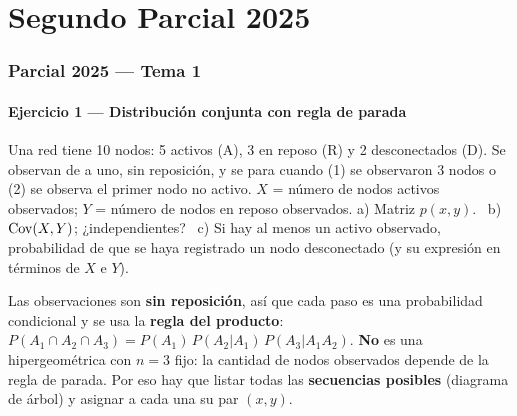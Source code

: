 \newpage
\part{Segundo Parcial 2025}
\section{Parcial 2025 --- Tema 1}

\subsection{Ejercicio 1 --- Distribución conjunta con regla de parada}
\begin{enun}
Una red tiene 10 nodos: 5 activos (A), 3 en reposo (R) y 2 desconectados (D). Se observan de a uno, sin reposición, y se para cuando (1) se observaron 3 nodos o (2) se observa el primer nodo no activo. $X$ = número de nodos activos observados; $Y$ = número de nodos en reposo observados.
a) Matriz $p(x,y)$. \ b) $\mathrm{Cov}(X,Y)$; ¿independientes? \ c) Si hay al menos un activo observado, probabilidad de que se haya registrado un nodo desconectado (y su expresión en términos de $X$ e $Y$).
\end{enun}
\begin{metodo}
Las observaciones son \textbf{sin reposición}, así que cada paso es una probabilidad condicional y se usa la \textbf{regla del producto}: $P(A_1\cap A_2\cap A_3)=P(A_1)\,P(A_2|A_1)\,P(A_3|A_1A_2)$.
\textbf{No} es una hipergeométrica con $n=3$ fijo: la cantidad de nodos observados depende de la regla de parada. Por eso hay que listar todas las \textbf{secuencias posibles} (diagrama de árbol) y asignar a cada una su par $(x,y)$.
\end{metodo}


